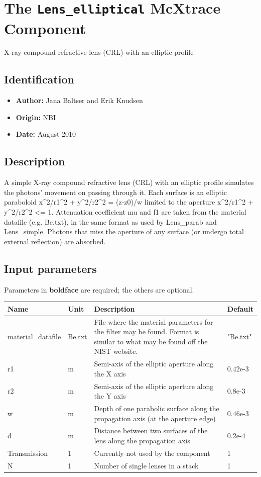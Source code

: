 \section{The \texttt{Lens\_elliptical} McXtrace Component}
X-ray compound refractive lens (CRL) with an elliptic profile

\subsection*{Identification}
\begin{itemize}
  \item \textbf{Author:} Jana Baltser and Erik Knudsen
  \item \textbf{Origin:} NBI
  \item \textbf{Date:} August 2010
\end{itemize}

\subsection*{Description}
A simple X-ray compound refractive lens (CRL) with an elliptic profile simulates the photons' movement on passing through it. Each surface is an elliptic paraboloid x\textasciicircum{}2/r1\textasciicircum{}2 + y\textasciicircum{}2/r2\textasciicircum{}2 = (z-z0)/w limited to the aperture x\textasciicircum{}2/r1\textasciicircum{}2 + y\textasciicircum{}2/r2\textasciicircum{}2 \textless{}= 1. Attenuation coefficient mu and f1 are taken from the material datafile (e.g. Be.txt), in the same format as used by Lens\_parab and Lens\_simple. Photons that miss the aperture of any surface (or undergo total external reflection) are absorbed.

\subsection*{Input parameters}
Parameters in \textbf{boldface} are required; the others are optional.

\begin{longtable}{p{}p{}p{}p{}}
\toprule
\textbf{Name} & \textbf{Unit} & \textbf{Description} & \textbf{Default} \\
\midrule
\endhead
material\_datafile & Be.txt & File where the material parameters for the filter may be found. Format is similar to what may be found off the NIST website. & "Be.txt" \\
r1 & m & Semi-axis of the elliptic aperture along the X axis & 0.42e-3 \\
r2 & m & Semi-axis of the elliptic aperture along the Y axis & 0.8e-3 \\
w & m & Depth of one parabolic surface along the propagation axis (at the aperture edge) & 0.46e-3 \\
d & m & Distance between two surfaces of the lens along the propagation axis & 0.2e-4 \\
Transmission & 1 & Currently not used by the component & 1 \\
N & 1 & Number of single lenses in a stack & 1 \\
\bottomrule
\end{longtable}

